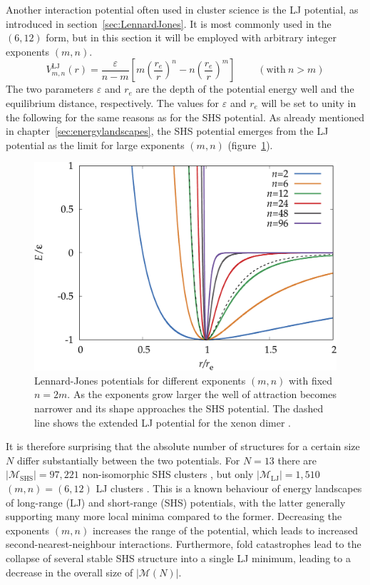 Another interaction potential often used in cluster science is the \acf{LJ}
potential, as introduced in section~\ref{sec:LennardJones}. It is most commonly
used in the $(6,12)$ form, but in this section it will be employed with
arbitrary integer exponents $(m,n)$.
%
\begin{equation}
    V_{m,n}^\mathrm{LJ}(r)=\frac{\varepsilon}{n-m}\left[m\left(\frac{r_e}{r}\right)^{n}-n\left(\frac{r_e}{r}\right)^{m}\right] \ \ \ \ \ \ \ \ \ \  (\mathrm{with}\ n > m)
\label{eqn:nmpot}
\end{equation}
%
The two parameters $\varepsilon$ and $r_e$ are the depth of the potential energy
well and the equilibrium distance, respectively. The values for $\varepsilon$
and $r_e$ will be set to unity in the following for the same reasons as for the
\ac{SHS} potential. As already mentioned in chapter~\ref{sec:energylandscapes},
the \ac{SHS} potential emerges from the \ac{LJ} potential as the limit for large
exponents $(m,n)$ (figure~\ref{fig:LJ}).
%
\begin{figure}[htb]\centering
    \includegraphics[width=0.8\columnwidth]{kslj/exampleLJ.pdf}
    \caption{Lennard-Jones potentials for different exponents $(m,n)$ with
    fixed $n=2m$. As the exponents grow larger the well of attraction becomes narrower 
    and its shape approaches the \acs{SHS} potential. The dashed line
    shows the extended LJ potential for the xenon dimer \autocite{Jerabek_relativisticcoupledclusterinteraction_2017}.}
    \label{fig:LJ}
\end{figure}
%
It is therefore surprising that the absolute number of structures for a certain
size $N$ differ substantially between the two potentials. For $N=13$ there are
$|\mathcal{M}_\mathrm{SHS}|=97,221$ non-isomorphic \ac{SHS} clusters
\autocite{Hoy_Structuredynamicsmodel_2015,Holmes-Cerfon_EnumeratingRigidSphere_2016},
but only $|\mathcal{M}_\mathrm{LJ}|=1,510$ $(m,n) = (6,12)$ \ac{LJ} clusters
\autocite{Doye_Evolutionpotentialenergy_1999}. This is a known behaviour of
energy landscapes of long-range (LJ) and short-range (SHS) potentials, with the
latter generally supporting many more local minima compared to the
former.\autocite{braier90,Wales_MicroscopicBasisGlobal_2001} Decreasing the
exponents $(m,n)$ increases the range of the potential, which leads to increased
second-nearest-neighbour interactions. Furthermore, fold
catastrophes\autocite{Wales_MicroscopicBasisGlobal_2001,Wales_Energylandscapes_2003}
lead to the collapse of several stable \ac{SHS} structure into a single \ac{LJ}
minimum, leading to a decrease in the overall size of $|\mathcal{M}(N)|$.

